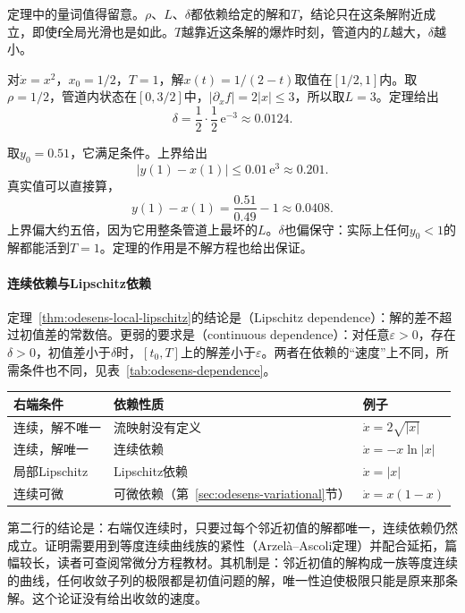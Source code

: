 定理中的量词值得留意。$\rho$、$L$、$\delta$都依赖给定的解和$T$，结论只在这条解附近成立，即使$\bm{f}$全局光滑也是如此。$T$越靠近这条解的爆炸时刻，管道内的$L$越大，$\delta$越小。

\begin{example}[管道的具体数字]
\label{ex:odesens-tube}
对$\dot{x}=x^2$，$x_0=1/2$，$T=1$，解$x(t)=1/(2-t)$取值在$[1/2,1]$内。取$\rho=1/2$，管道内状态在$[0,3/2]$中，$\lvert\partial_xf\rvert=2\lvert x\rvert\leq3$，所以取$L=3$。定理给出
\[
 \delta=\frac12\cdot\frac12\,\mathrm{e}^{-3}\approx0.0124.
\]

取$y_0=0.51$，它满足条件。上界给出
\[
 \lvert y(1)-x(1)\rvert\leq0.01\,\mathrm{e}^{3}\approx0.201.
\]
真实值可以直接算，
\[
 y(1)-x(1)=\frac{0.51}{0.49}-1\approx0.0408.
\]
上界偏大约五倍，因为它用整条管道上最坏的$L$。$\delta$也偏保守：实际上任何$y_0<1$的解都能活到$T=1$。定理的作用是不解方程也给出保证。
\end{example}

\paragraph{连续依赖与Lipschitz依赖}
定理~\ref{thm:odesens-local-lipschitz}的结论是（Lipschitz dependence）：解的差不超过初值差的常数倍。更弱的要求是（continuous dependence）：对任意$\varepsilon>0$，存在$\delta>0$，初值差小于$\delta$时，$[t_0,T]$上的解差小于$\varepsilon$。两者在依赖的“速度”上不同，所需条件也不同，见表~\ref{tab:odesens-dependence}。

\begin{BookInlineTable}
  \centering
  \caption{初值依赖的层次。结论都是给定解附近、紧时间段上的局部结论。}
  \label{tab:odesens-dependence}
  \begin{tabular}{p{28mm}p{32mm}p{38mm}}
    \toprule
    右端条件 & 依赖性质 & 例子 \\
    \midrule
    连续，解不唯一 & 流映射没有定义 & $\dot{x}=2\sqrt{\lvert x\rvert}$ \\
    连续，解唯一 & 连续依赖 & $\dot{x}=-x\ln\lvert x\rvert$ \\
    局部Lipschitz & Lipschitz依赖 & $\dot{x}=\lvert x\rvert$ \\
    连续可微 & 可微依赖（第~\ref{sec:odesens-variational}节） & $\dot{x}=x(1-x)$ \\
    \bottomrule
  \end{tabular}
\end{BookInlineTable}

第二行的结论是：右端仅连续时，只要过每个邻近初值的解都唯一，连续依赖仍然成立。证明需要用到等度连续曲线族的紧性（Arzelà--Ascoli定理）并配合延拓，篇幅较长，读者可查阅常微分方程教材。其机制是：邻近初值的解构成一族等度连续的曲线，任何收敛子列的极限都是初值问题的解，唯一性迫使极限只能是原来那条解。这个论证没有给出收敛的速度。

